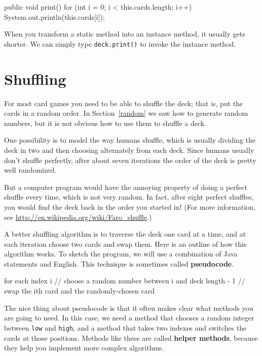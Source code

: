 \documentclass[12pt]{book}
\theoremstyle{exercise}
\newcommand{\java}[1]{\verb"#1"}
\begin{document}
\begin{code}
    public void print() {
        for (int i = 0; i < this.cards.length; i++) {
            System.out.println(this.cards[i]);
        }
    }
\end{code}

When you transform a static method into an instance method, it usually gets shorter.
We can simply type \java{deck.print()} to invoke the instance method.


\section{Shuffling}
\label{shuffle}


For most card games you need to be able to shuffle the deck; that is, put the cards in a random order.
In Section~\ref{random} we saw how to generate random numbers, but it is not obvious how to use them to shuffle a deck.

One possibility is to model the way humans shuffle, which is usually dividing the deck in two and then choosing alternately from each deck.
Since humans usually don't shuffle perfectly, after about seven iterations the order of the deck is pretty well randomized.

But a computer program would have the annoying property of doing a perfect shuffle every time, which is not very random.
In fact, after eight perfect shuffles, you would find the deck back in the order you started in!
(For more information, see \url{http://en.wikipedia.org/wiki/Faro_shuffle}.)


A better shuffling algorithm is to traverse the deck one card at a time, and at each iteration choose two cards and swap them.
Here is an outline of how this algorithm works.
To sketch the program, we will use a combination of Java statements and English.
This technique is sometimes called {\bf pseudocode}.

\begin{code}
    for each index i {
        // choose a random number between i and deck length - 1
        // swap the ith card and the randomly-chosen card
    }
\end{code}

The nice thing about pseudocode is that it often makes clear what methods you are going to need.
In this case, we need a method that chooses a random integer between \java{low} and \java{high}, and a method that takes two indexes and switches the cards at those positions.
Methods like these are called {\bf helper methods}, because they help you implement more complex algorithms.
\end{document}
